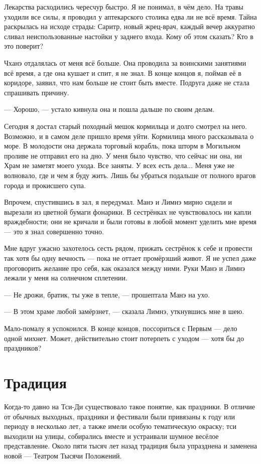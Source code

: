 Лекарства расходились чересчур быстро.
Я не понимал, в чём дело.
На травы уходили все силы, я проводил у аптекарского столика едва ли не всё время.
Тайна раскрылась на исходе страды: Саритр, новый жрец-врач, каждый вечер аккуратно сливал неиспользованные настойки у заднего входа.
Кому об этом сказать?
Кто в это поверит?

Чханэ отдалялась от меня всё больше.
Она проводила за воинскими занятиями всё время, а где она кушает и спит, я не знал.
В конце концов я, поймав её в коридоре, заявил, что нам больше не стоит быть вместе.
Подруга даже не стала спрашивать причину.

--- Хорошо, --- устало кивнула она и пошла дальше по своим делам.

Сегодня я достал старый походный мешок кормильца и долго смотрел на него.
Возможно, и в самом деле пришло время уйти.
Кормилица много рассказывала о море.
В молодости она держала торговый корабль, пока шторм в Могильном проливе не отправил его на дно.
У меня было чувство, что сейчас ни она, ни Храм не заметят моего ухода.
Все заняты.
У всех есть дела...
Меня уже не волновало, где и чем я буду жить.
Лишь бы убраться подальше от полного врагов города и прокисшего супа.

Впрочем, спустившись в зал, я передумал.
Манэ и Лимнэ мирно сидели и вырезали из цветной бумаги фонарики.
В сестрёнках не чувствовалось ни капли враждебности;
они не кричали и были готовы в любой момент уделить мне время --- это я знал совершенно точно.

Мне вдруг ужасно захотелось сесть рядом, прижать сестрёнок к себе и провести так хотя бы одну вечность --- пока не оттает промёрзший живот.
Я не успел даже проговорить желание про себя, как оказался между ними.
Руки Манэ и Лимнэ лежали у меня на солнечном сплетении.

--- Не дрожи, братик, ты уже в тепле, --- прошептала Манэ на ухо.

--- В этом храме любой замёрзнет, --- сказала Лимнэ, уткнувшись мне в шею.

Мало-помалу я успокоился.
В конце концов, поссориться с Первым --- дело одной михнет.
Может, действительно стоит потерпеть с уходом --- хотя бы до праздников?

\section{Традиция}

Когда-то давно на Тси-Ди существовало такое понятие, как праздники.
В отличие от обычных выходных, праздники и фестивали были привязаны к году или периоду в несколько лет, а также имели особую тематическую окраску;
тси выходили на улицы, собирались вместе и устраивали шумное весёлое представление.
Около пяти тысяч лет назад традиция была упразднена и заменена новой --- Театром Тысячи Положений.

